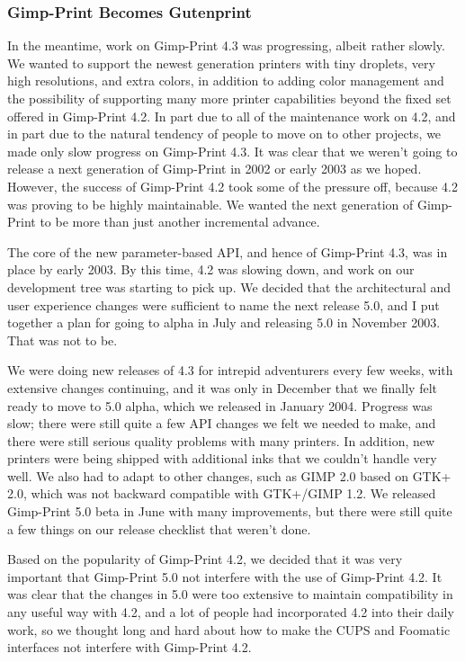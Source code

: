 \documentclass{article}[letter]
\begin{document}
\subsubsection{Gimp-Print Becomes Gutenprint}

In the meantime, work on Gimp-Print 4.3 was progressing, albeit rather
slowly. We wanted to support the newest generation printers with tiny
droplets, very high resolutions, and extra colors, in addition to
adding color management and the possibility of supporting many more
printer capabilities beyond the fixed set offered in Gimp-Print
4.2. In part due to all of the maintenance work on 4.2, and in part
due to the natural tendency of people to move on to other projects, we
made only slow progress on Gimp-Print 4.3. It was clear that we
weren't going to release a next generation of Gimp-Print in 2002 or
early 2003 as we hoped. However, the success of Gimp-Print 4.2 took
some of the pressure off, because 4.2 was proving to be highly
maintainable. We wanted the next generation of Gimp-Print to be more
than just another incremental advance.

The core of the new parameter-based API, and hence of Gimp-Print 4.3,
was in place by early 2003. By this time, 4.2 was slowing down, and
work on our development tree was starting to pick up. We decided that
the architectural and user experience changes were sufficient to name
the next release 5.0, and I put together a plan for going to alpha in
July and releasing 5.0 in November 2003. That was not to be.

We were doing new releases of 4.3 for intrepid adventurers every few
weeks, with extensive changes continuing, and it was only in December
that we finally felt ready to move to 5.0 alpha, which we released in
January 2004. Progress was slow; there were still quite a few API
changes we felt we needed to make, and there were still serious
quality problems with many printers. In addition, new printers were
being shipped with additional inks that we couldn't handle very
well. We also had to adapt to other changes, such as GIMP 2.0 based on
GTK+ 2.0, which was not backward compatible with GTK+/GIMP 1.2. We
released Gimp-Print 5.0 beta in June with many improvements, but there
were still quite a few things on our release checklist that weren't
done.

Based on the popularity of Gimp-Print 4.2, we decided that it was very
important that Gimp-Print 5.0 not interfere with the use of Gimp-Print
4.2. It was clear that the changes in 5.0 were too extensive to
maintain compatibility in any useful way with 4.2, and a lot of people
had incorporated 4.2 into their daily work, so we thought long and
hard about how to make the CUPS and Foomatic interfaces not interfere
with Gimp-Print 4.2.
\end{document}
